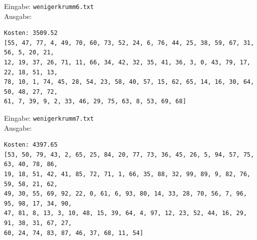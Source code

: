 \documentclass[a4paper,10pt,ngerman]{scrartcl}
\begin{document}
Eingabe: \lstinline|wenigerkrumm6.txt| \\ Ausgabe:
\begin{lstlisting}
Kosten: 3509.52
[55, 47, 77, 4, 49, 70, 60, 73, 52, 24, 6, 76, 44, 25, 38, 59, 67, 31, 56, 5, 20, 21,
12, 19, 37, 26, 71, 11, 66, 34, 42, 32, 35, 41, 36, 3, 0, 43, 79, 17, 22, 18, 51, 13, 
78, 10, 1, 74, 45, 28, 54, 23, 58, 40, 57, 15, 62, 65, 14, 16, 30, 64, 50, 48, 27, 72, 
61, 7, 39, 9, 2, 33, 46, 29, 75, 63, 8, 53, 69, 68]
\end{lstlisting}
Eingabe: \lstinline|wenigerkrumm7.txt| \\ Ausgabe:
\begin{lstlisting}
Kosten: 4397.65
[53, 50, 79, 43, 2, 65, 25, 84, 20, 77, 73, 36, 45, 26, 5, 94, 57, 75, 63, 40, 78, 86, 
19, 18, 51, 42, 41, 85, 72, 71, 1, 66, 35, 88, 32, 99, 89, 9, 82, 76, 59, 58, 21, 62, 
49, 30, 55, 69, 92, 22, 0, 61, 6, 93, 80, 14, 33, 28, 70, 56, 7, 96, 95, 98, 17, 34, 90, 
47, 81, 8, 13, 3, 10, 48, 15, 39, 64, 4, 97, 12, 23, 52, 44, 16, 29, 91, 38, 31, 67, 27, 
60, 24, 74, 83, 87, 46, 37, 68, 11, 54]
\end{lstlisting}
\end{document}
